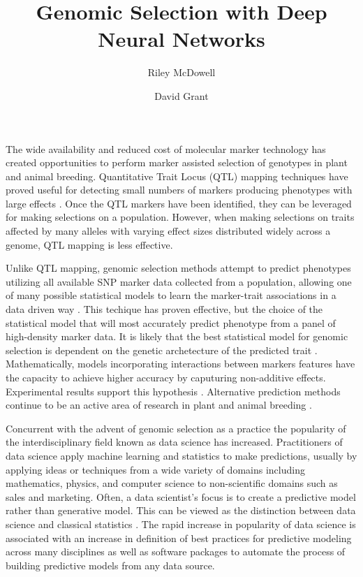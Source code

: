 \documentclass[9pt,twocolumn,twoside]{g3_article/gsag3jnl}
\title{Genomic Selection with Deep Neural Networks}
\author[$\ast$,1]{Riley McDowell}
\author[$\dagger$]{David Grant}
\affil[$\ast$]{Iowa State University, US}
\affil[$\dagger$]{Iowa State University, US}
\begin{document}
\maketitle
\thispagestyle{firststyle}
\logomark
\articletypemark
\marginmark
\firstpagefootnote
{}
\vspace{-11pt}

\noindent %

The wide availability and reduced cost of molecular marker technology
has created opportunities to perform marker assisted selection of genotypes
in plant and animal breeding. Quantitative Trait Locus (QTL) mapping techniques
have proved useful for detecting small numbers of markers producing 
phenotypes with large effects \citep{miles2008}. Once the QTL 
markers have been identified, they can be leveraged for making selections
on a population. However, when making selections on traits affected by many 
alleles with varying effect sizes distributed widely across a genome, 
QTL mapping is less effective. 

Unlike QTL mapping, genomic selection methods attempt to predict phenotypes 
utilizing all available SNP marker data collected from a population,
allowing one of many possible statistical models to learn the marker-trait 
associations in a data driven way \citep{meuwissen2001}. This techique has
proven effective, but the choice of the statistical model that will most
accurately predict phenotype from a panel of high-density marker data. It is likely 
that the best statistical model for genomic selection is dependent on the genetic 
archetecture of the predicted trait \citep{crossa2010, gonzalez-camacho2012, 
resende2012, cleveland2012, thavamanikumar2015}.  Mathematically, models incorporating 
interactions between markers features have the capacity to achieve higher accuracy 
by caputuring non-additive effects. Experimental results support this 
hypothesis \citep{gonzalez-camacho2012}. Alternative prediction methods continue 
to be an active area of research in plant and animal breeding \citep{koning2012}.

Concurrent with the advent of genomic selection as a practice the popularity of the 
interdisciplinary field known as data science has increased. Practitioners of data 
science apply machine learning and statistics to make predictions, usually
by applying ideas or techniques from a wide variety of domains 
including mathematics, physics, and computer science to non-scientific 
domains such as sales and marketing. Often, a data scientist's focus is to
create a predictive model rather than generative model. This can be viewed 
as the distinction between data science and classical statistics 
\citep{donoho2015, breiman2001}. The rapid increase in popularity of data science
is associated with an increase in definition of best practices for predictive modeling
across many disciplines as well as software packages to automate the 
process of building predictive models from any data source.
\end{document}
